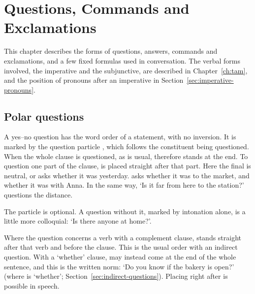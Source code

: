 \chapter{Questions, Commands and Exclamations}\label{ch:sentence-types}

This chapter describes the forms of questions, answers, commands and exclamations, and a few fixed formulas used in conversation. The verbal forms involved, the imperative and the subjunctive, are described in Chapter~\ref{ch:tam}, and the position of pronouns after an imperative in Section~\ref{sec:imperative-pronouns}.

\section{Polar questions}\label{sec:polar-questions}
A yes--no question has the word order of a statement, with no inversion. It is marked by the question particle , which follows the constituent being questioned. When the whole clause is questioned, as is usual,  therefore stands at the end.
To question one part of the clause,  is placed straight after that part.
Here the final  is neutral, or asks whether it was yesterday.  asks whether it was to the market, and  whether it was with Anna. In the same way,  `Is it far from here to the station?' questions the distance.

The particle is optional. A question without it, marked by intonation alone, is a little more colloquial:  `Is there anyone at home?'.

Where the question concerns a verb with a complement clause,  stands straight after that verb and before the clause. This is the usual order with an indirect question.
With a `whether' clause,  may instead come at the end of the whole sentence, and this is the written norm:  `Do you know if the bakery is open?' (where  is `whether'; Section~\ref{sec:indirect-questions}). Placing  right after  is possible in speech.

